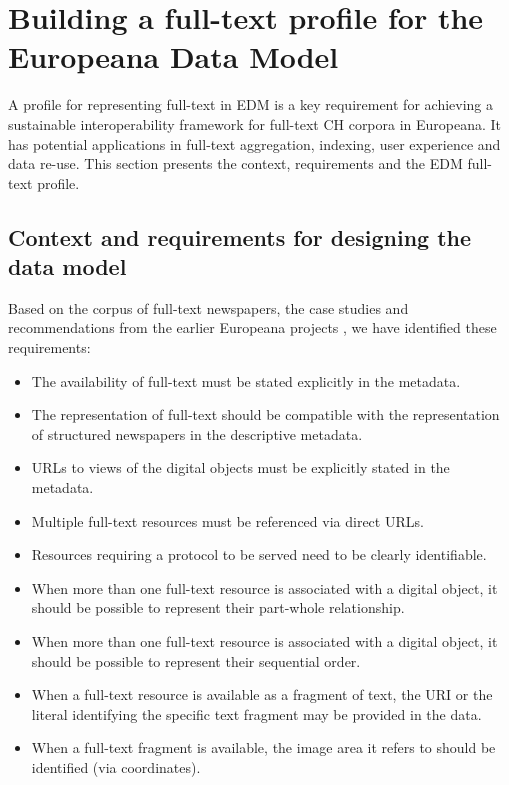 \documentclass[a4paper,UKenglish,cleveref, autoref]{oasics-v2019}
\begin{document}
\section{Building a full-text profile for the Europeana Data Model}
\label{sec:buildingfulltextprofile}

A profile for representing full-text in EDM is a key requirement for achieving a sustainable interoperability framework for full-text CH corpora in Europeana. It has potential applications in full-text aggregation, indexing, user experience and data re-use. This section presents the context, requirements and the EDM full-text profile.

\subsection{Context and requirements for designing the data model}
\label{sec:contextandrequirements}

Based on the corpus of full-text newspapers, the case studies and recommendations from the earlier Europeana projects \cite{Dunning15, Charles16}, we have identified these requirements:
\begin{itemize}
\item The availability of full-text must be stated explicitly in the metadata.
\item The representation of full-text should be compatible with the representation of structured newspapers in the descriptive metadata.
\item URLs to views of the digital objects must be explicitly stated in the metadata.
\item Multiple full-text resources must be referenced via direct URLs. 
\item Resources requiring a protocol to be served need to be clearly identifiable.
\item When more than one full-text resource is associated with a digital object, it should be possible to represent their part-whole relationship. 
\item When more than one full-text resource is associated with a digital object, it should be possible to represent their sequential order. 
\item When a full-text resource is available as a fragment of text, the URI or the literal identifying the specific text fragment may be provided in the data.
\item When a full-text fragment is available, the image area it refers to should be identified (via coordinates).
\end{itemize}
\end{document}
